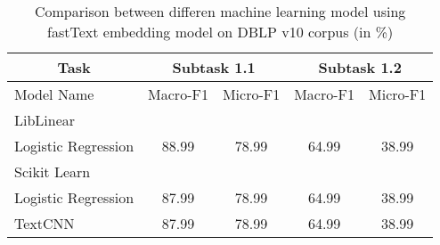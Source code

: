 \begin{table}[htbp!] %
    \begin{tabular}{lcccc}
    \toprule
        \multicolumn{1}{c}{Task}                                                 & \multicolumn{2}{c}{Subtask 1.1} & \multicolumn{2}{c}{Subtask 1.2} \\
    \midrule
        Model Name                                                                 & Macro-F1        & Micro-F1       & Macro-F1        & Micro-F1       \\
    \midrule
        LibLinear\\ Logistic Regression    & 88.99            & 78.99           & 64.99            & 38.99           \\
        Scikit Learn\\ Logistic Regression & 87.99            & 78.99           & 64.99            & 38.99           \\
        TextCNN                            & 87.99            & 78.99           & 64.99            & 38.99           \\
    \bottomrule
    \end{tabular}
\caption{Comparison between differen machine learning model using fastText embedding model on DBLP v10 corpus (in \%)}
\label{tab:ML_Model}
\end{table}
